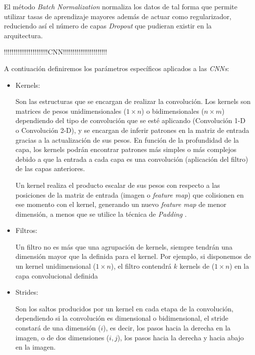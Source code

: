 \begin{itemize}
                    El método \textit{Batch Normalization} \cite{BatchNormalization} normaliza los datos de tal forma que permite utilizar tasas de aprendizaje mayores además de actuar como regularizador, reduciendo así el número de capas \textit{Dropout} que pudieran existir en la arquitectura.

            \end{itemize}

            !!!!!!!!!!!!!!!!!!!!!!!CNN!!!!!!!!!!!!!!!!!!!!!!!

            A contiuación definiremos los parámetros específicos aplicados a las \textit{CNNs}:

            \begin{itemize}

                \item Kernels:

                    Son las estructuras que se encargan de realizar la convolución. Los kernels son matrices de pesos unidimensionales ($1 \times n$) o bidimensionales ($n \times m$) dependiendo del tipo de convolución que se esté aplicando (Convolución 1-D o Convolución 2-D), y se encargan de inferir patrones en la matriz de entrada gracias a la actualización de sus pesos. En función de la profundidad de la capa, los kernels podrán encontrar patrones más simples o más complejos debido a que la entrada a cada capa es una convolución (aplicación del filtro) de las capas anteriores.

                    Un kernel realiza el producto escalar de sus pesos con respecto a las posiciones de la matriz de entrada (imagen o \textit{feature map}) que colisionen en ese momento con el kernel, generando un nuevo \textit{feature map} de menor dimensión, a menos que se utilice la técnica de \textit{Padding} \cite{Kernels}.
                     
                \item Filtros:

                    Un filtro no es más que una agrupación de kernels, siempre tendrán una dimensión mayor que la definida para el kernel. Por ejemplo, si disponemos de un kernel unidimensional ($1 \times n$), el filtro contendrá $k$ kernels de ($1 \times n$) en la capa convolucional definida \cite{FiltersFeatureMaps}

                \item Strides:

                    Son los saltos producidos por un kernel en cada etapa de la convolución, dependiendo si la convolución es dimensional o bidimensional, el stride constará de una dimensión ($i$), es decir, los pasos hacia la derecha en la imagen, o de dos dimensiones ($i, j$), los pasos hacia la derecha y hacia abajo en la imagen.


\end{itemize}
